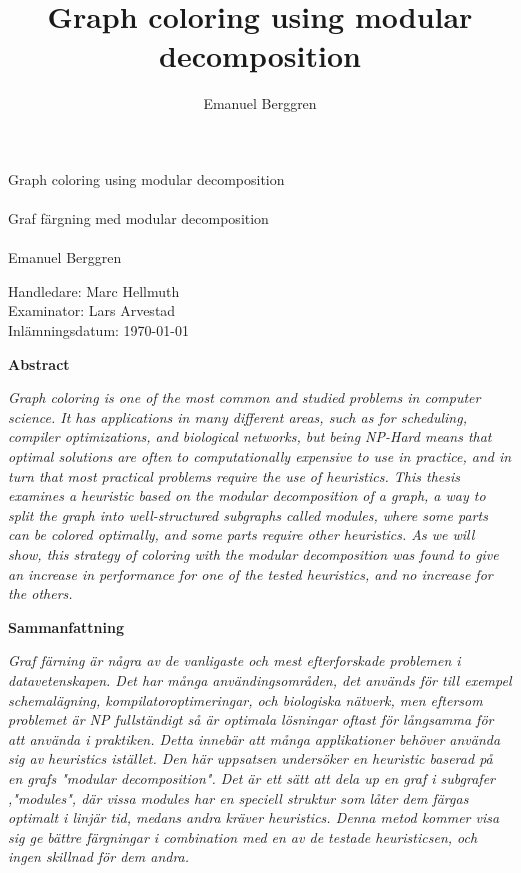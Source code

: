 \documentclass[a4paper]{article}
\author{Emanuel Berggren}
\title{Graph coloring using modular decomposition}
\newcommand{\Framsida}{\AddToShipoutPicture*{\put(0,0){\texttt{[image: kandidatfram.pdf]}}}}
\newenvironment{NewFont}[1] {\fontfamily{#1}\selectfont}{\par}
\begin{document}
\sloppy
\Framsida 
\vspace*{4cm}
\Huge{Graph coloring using modular decomposition}\\\\ %
\Huge{Graf färgning med modular decomposition}\\\\ %
\Large{Emanuel Berggren} %

\vspace*{12cm}
\Large{Handledare: Marc Hellmuth} \\ 
\Large{Examinator: Lars Arvestad} \\ 
\Large{Inlämningsdatum: \today}\\


\newpage
\begin{NewFont}{cmss}
\begin{center}
	\textbf{Abstract}
\end{center}
\textit{
Graph coloring is one of the most common and studied problems in computer
science. It has applications in many different areas, such as for scheduling,
compiler optimizations, and biological networks, but
being NP-Hard means that optimal solutions are often to computationally expensive to use in practice, and in turn that most
practical problems require the use of heuristics. This thesis examines a
heuristic based on the modular decomposition of a graph, a way to split the graph
into well-structured subgraphs called modules, where some parts can be colored optimally,
and some parts require other heuristics. As we will show, this strategy of coloring with the
modular decomposition was found to give an increase in performance for one
of the tested heuristics, and no increase for the others.
}
\begin{center}
	\textbf{Sammanfattning}
\end{center}
\textit{
Graf färning är några av de vanligaste och mest efterforskade problemen i datavetenskapen.
Det har många användingsområden, det används för till exempel schemalägning, 
kompilatoroptimeringar, och biologiska nätverk, men eftersom problemet är 
NP fullständigt så är optimala lösningar oftast för långsamma för att använda i praktiken. Detta innebär att 
många applikationer behöver använda sig av heuristics istället. Den här uppsatsen undersöker en heuristic
baserad på en  grafs "modular decomposition". Det är ett sätt att dela up en graf i subgrafer ,"modules", där vissa modules har en speciell
struktur som låter dem färgas optimalt i linjär tid, medans andra kräver heuristics. Denna metod kommer visa sig ge bättre
färgningar i combination med en av de testade heuristicsen, och ingen skillnad för dem andra.
}
\end{NewFont}
\end{document}
